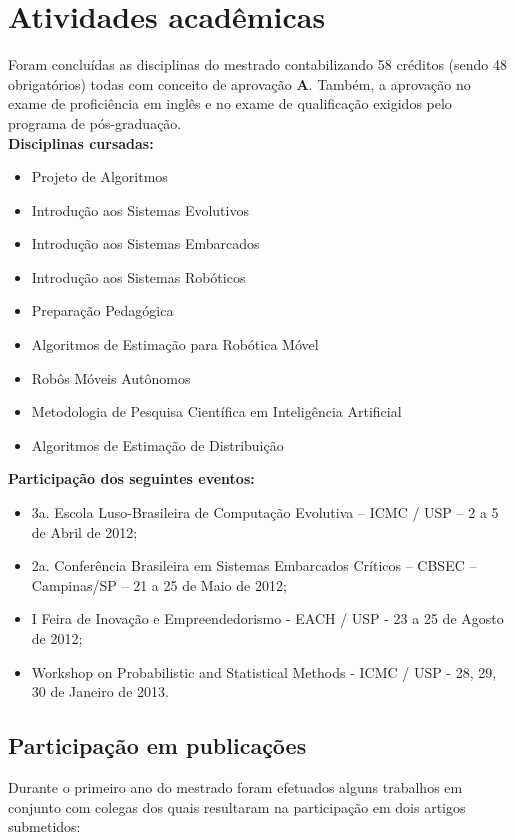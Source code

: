\documentclass{article}
\begin{document}
\section{Atividades acadêmicas}

Foram concluídas as disciplinas do mestrado contabilizando 58 créditos (sendo
48 obrigatórios) todas com conceito de aprovação \textbf{A}. Também, a aprovação
no exame de proficiência em inglês e no exame de qualificação exigidos pelo programa de
pós-graduação.\\

\textbf{Disciplinas cursadas:}
\begin{itemize}
\item Projeto de Algoritmos
\item Introdução aos Sistemas Evolutivos
\item Introdução aos Sistemas Embarcados
\item Introdução aos Sistemas Robóticos
\item Preparação Pedagógica
\item Algoritmos de Estimação para Robótica Móvel
\item Robôs Móveis Autônomos
\item Metodologia de Pesquisa Científica em Inteligência Artificial
\item Algoritmos de Estimação de Distribuição
\end{itemize}

\textbf{Participação dos seguintes eventos:}
\begin{itemize}
\item 3a. Escola Luso-Brasileira de Computação Evolutiva – ICMC / USP – 2 a 5 de
Abril de 2012;
\item 2a. Conferência Brasileira em Sistemas Embarcados Críticos – CBSEC –
Campinas/SP – 21 a 25 de Maio de 2012;
\item I Feira de Inovação e Empreendedorismo - EACH / USP - 23 a 25 de Agosto de
2012;
\item Workshop on Probabilistic and Statistical Methods - ICMC / USP - 28, 29,
30 de Janeiro de 2013.
\end{itemize}

\subsection{Participação em publicações}

Durante o primeiro ano do mestrado foram efetuados alguns trabalhos em conjunto
com colegas dos quais resultaram na participação em dois artigos submetidos:\\
\end{document}
